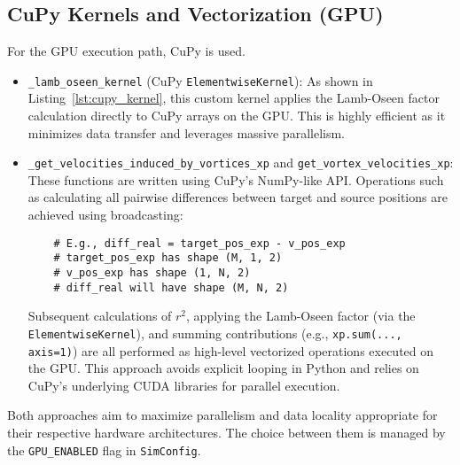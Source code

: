 \documentclass[12pt,letterpaper]{article}
\begin{document}
\subsection{CuPy Kernels and Vectorization (GPU)}
For the GPU execution path, CuPy is used.
\begin{itemize}
    \item \texttt{\_lamb\_oseen\_kernel} (CuPy \texttt{ElementwiseKernel}): As shown in Listing~\ref{lst:cupy_kernel}, this custom kernel applies the Lamb-Oseen factor calculation directly to CuPy arrays on the GPU. This is highly efficient as it minimizes data transfer and leverages massive parallelism.
    \item \texttt{\_get\_velocities\_induced\_by\_vortices\_xp} and \texttt{get\_vortex\_velocities\_xp}: These functions are written using CuPy's NumPy-like API. Operations such as calculating all pairwise differences between target and source positions are achieved using broadcasting:
    \begin{verbatim}
    # E.g., diff_real = target_pos_exp - v_pos_exp
    # target_pos_exp has shape (M, 1, 2)
    # v_pos_exp has shape (1, N, 2)
    # diff_real will have shape (M, N, 2)
    \end{verbatim}
    Subsequent calculations of $r^2$, applying the Lamb-Oseen factor (via the \texttt{ElementwiseKernel}), and summing contributions (e.g., \texttt{xp.sum(..., axis=1)}) are all performed as high-level vectorized operations executed on the GPU. This approach avoids explicit looping in Python and relies on CuPy's underlying CUDA libraries for parallel execution.
\end{itemize}
Both approaches aim to maximize parallelism and data locality appropriate for their respective hardware architectures. The choice between them is managed by the \texttt{GPU\_ENABLED} flag in \texttt{SimConfig}.

\end{document}
